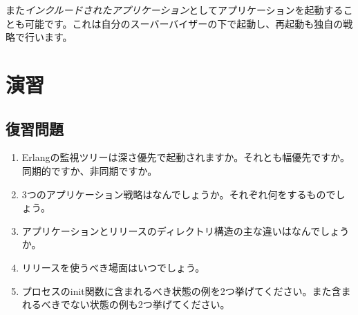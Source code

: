 また\emph{インクルードされたアプリケーション}としてアプリケーションを起動することも可能です。これは自分のスーバーバイザーの下で起動し、再起動も独自の戦略で行います。

\section{演習}

\subsection*{復習問題}

\begin{enumerate}
  \item Erlangの監視ツリーは深さ優先で起動されますか。それとも幅優先ですか。同期的ですか、非同期ですか。
  \item 3つのアプリケーション戦略はなんでしょうか。それぞれ何をするものでしょう。  
  \item アプリケーションとリリースのディレクトリ構造の主な違いはなんでしょうか。  
  \item リリースを使うべき場面はいつでしょう。  
  \item プロセスのinit関数に含まれるべき状態の例を2つ挙げてください。また含まれるべきでない状態の例も2つ挙げてください。
\end{enumerate}

